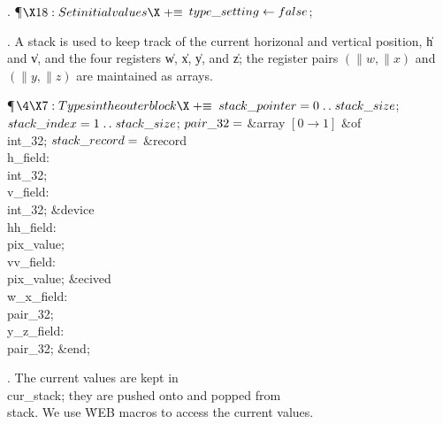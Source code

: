 . \P$\X18:Set initial values\X\mathrel{+}\S$\6
$\\{type\_setting}\K\\{false}$;\par
\fi

. A stack is used to keep track of the current horizonal and vertical
position, \|h and \|v, and the four registers \|w, \|x, \|y, and \|z;
the register pairs $(\|w,\|x)$ and $(\|y,\|z)$ are maintained as arrays.

\Y\P$\4\X7:Types in the outer block\X\mathrel{+}\S$\6
$\\{stack\_pointer}=0\to\\{stack\_size}$;\6
$\\{stack\_index}=1\to\\{stack\_size}$;\6
$\\{pair\_32}=$\1\5
\&{array} $[0\to1]$ \1\&{of}\5
\\{int\_32};\2\2\6
$\\{stack\_record}=$\1\5
\1\&{record} \\{h\_field}: \\{int\_32};\6
\4\\{v\_field}: \\{int\_32};\6
\&{device} \\{hh\_field}: \\{pix\_value};\6
\4\\{vv\_field}: \\{pix\_value};\6
\&{ecived}\6
\4\\{w\_x\_field}: \\{pair\_32};\6
\4\\{y\_z\_field}: \\{pair\_32};\2\6
\&{end};\2\par
\fi

. The current values are kept in \\{cur\_stack}; they are pushed onto and
popped from \\{stack}. We use \.{WEB} macros to access the current values.

